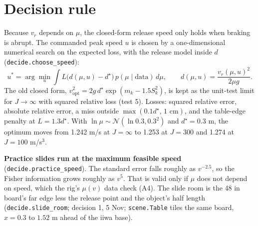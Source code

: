 \documentclass[10pt]{article}
\newcommand{\dstar}{d^{\star}}
\newcommand{\code}[1]{\texttt{#1}}
\begin{document}
\section{Decision rule}
\label{sec:decision}
Because $v_r$ depends on $\mu$, the closed-form release speed only holds when braking is abrupt.  The commanded peak
speed $u$ is chosen by a one-dimensional numerical search on the expected loss, with the release model inside $d$
(\code{decide.choose\_speed}):
\begin{equation}
u^{*}=\arg\min_{u}\int L\big(d(\mu,u)-\dstar\big)\,p(\mu\mid\text{data})\,d\mu,\qquad
d(\mu,u)=\frac{v_r(\mu,u)^{2}}{2\mu g}.
\end{equation}
The old closed form, $v_{\text{opt}}^{2}=2g\,\dstar\exp(m_k-1.5S_k^{2})$, is kept as the unit-test limit for
$J\to\infty$ with squared relative loss (test 5).  Losses: squared relative error, absolute relative error, a miss
outside $\max(0.1\dstar,\,1\text{ cm})$, and the table-edge penalty at $L=1.3\dstar$.  With $\ln\mu\sim\mathcal N(\ln0.3,0.3^2)$
and $\dstar=0.3$ m, the optimum moves from 1.242 m/s at $J=\infty$ to 1.253 at $J=300$ and 1.274 at $J=100$ m/s$^3$.

\textbf{Practice slides run at the maximum feasible speed} (\code{decide.practice\_speed}).  The standard error
falls roughly as $v^{-2.5}$, so the Fisher information grows roughly as $v^{5}$.  That is valid only if $\mu$ does not
depend on speed, which the rig's $\mu(v)$ data check (A4).  The slide room is the 48 in board's far edge less the release
point and the object's half length (\code{decide.slide\_room}; decision 1, 5 Nov; \code{scene.Table} tiles the same board,
$x = 0.3$ to $1.52$ m ahead of the iiwa base).
\end{document}
